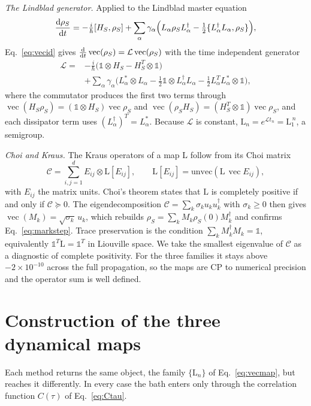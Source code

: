 \documentclass[aps,pra,twocolumn,superscriptaddress,nofootinbib,longbibliography]{revtex4-2}
\DeclareMathOperator{\vecc}{vec}
\newcommand{\id}{\mathds{1}}
\newcommand{\rhoS}{\rho_{S}}
\newcommand{\Ldt}{\mathcal{L}}
\newcommand{\Lmap}{\mathrm{L}}
\begin{document}
\emph{The Lindblad generator.} Applied to the Lindblad master
equation~\cite{lindblad1976,gks1976}
\begin{equation}
  \dv{\rhoS}{t}=-\tfrac{i}{\hbar}[H_S,\rhoS]+\sum_\alpha\gamma_\alpha\Big(L_\alpha\rhoS L_\alpha^\dagger-\tfrac12\{L_\alpha^\dagger L_\alpha,\rhoS\}\Big),
\end{equation}
Eq.~\eqref{eq:vecid} gives $\dv{}{t}\vecc(\rhoS)=\Ldt\vecc(\rhoS)$ with the time
independent generator
\begin{equation}
\begin{split}
  \Ldt=&-\tfrac{i}{\hbar}\big(\id\otimes H_S-H_S^{T}\otimes\id\big)\\
  &+\sum_\alpha\gamma_\alpha\Big(L_\alpha^{*}\!\otimes\! L_\alpha
  -\tfrac12\id\otimes L_\alpha^\dagger L_\alpha-\tfrac12 L_\alpha^{T}L_\alpha^{*}\!\otimes\!\id\Big),
\end{split}
\end{equation}
where the commutator produces the first two terms through
$\vecc(H_S\rhoS)=(\id\otimes H_S)\vecc\rhoS$ and
$\vecc(\rhoS H_S)=(H_S^{T}\otimes\id)\vecc\rhoS$, and each dissipator term uses
$(L_\alpha^\dagger)^{T}=L_\alpha^{*}$. Because $\Ldt$ is constant,
$\Lmap_n=e^{\Ldt t_n}=\Lmap_1^{\,n}$, a semigroup.

\emph{Choi and Kraus.} The Kraus operators of a map $\Lmap$ follow from its Choi
matrix~\cite{choi1975}
\begin{equation}
  \mathcal{C}=\sum_{i,j=1}^{d}E_{ij}\otimes\Lmap[E_{ij}],\qquad
  \Lmap[E_{ij}]=\mathrm{unvec}(\Lmap\,\vecc E_{ij}),
\end{equation}
with $E_{ij}$ the matrix units. Choi's theorem states that $\Lmap$ is completely
positive if and only if $\mathcal{C}\succeq0$. The eigendecomposition
$\mathcal{C}=\sum_k\sigma_k u_k u_k^\dagger$ with $\sigma_k\ge0$ then gives
$\vecc(M_k)=\sqrt{\sigma_k}\,u_k$, which rebuilds
$\rhoS=\sum_k M_k\rhoS(0)M_k^\dagger$ and confirms Eq.~\eqref{eq:markstep}. Trace
preservation is the condition $\sum_k M_k^\dagger M_k=\id$, equivalently
$\id^{T}\Lmap=\id^{T}$ in Liouville space. We take the smallest eigenvalue of
$\mathcal{C}$ as a diagnostic of complete positivity. For the three families it
stays above $-2\times10^{-10}$ across the full propagation, so the maps are CP to
numerical precision and the operator sum is well defined.

\section{Construction of the three dynamical maps}
\label{app:maps}
Each method returns the same object, the family $\{\Lmap_n\}$ of
Eq.~\eqref{eq:vecmap}, but reaches it differently. In every case the bath enters
only through the correlation function $C(\tau)$ of Eq.~\eqref{eq:Ctau}.
\end{document}
